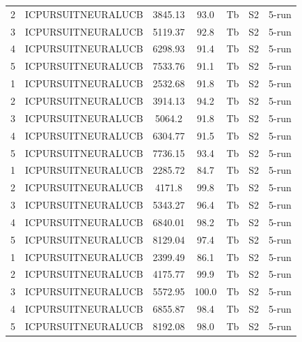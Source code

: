 \documentclass[11pt]{article}
\begin{document}
\begin{center}
\begin{longtable}{|c|c|c|c|c|c|c|}
2 & ICPURSUITNEURALUCB & 3845.13 & 93.0 & Tb & S2 & 5-run \\
3 & ICPURSUITNEURALUCB & 5119.37 & 92.8 & Tb & S2 & 5-run \\
4 & ICPURSUITNEURALUCB & 6298.93 & 91.4 & Tb & S2 & 5-run \\
5 & ICPURSUITNEURALUCB & 7533.76 & 91.1 & Tb & S2 & 5-run \\
1 & ICPURSUITNEURALUCB & 2532.68 & 91.8 & Tb & S2 & 5-run \\
2 & ICPURSUITNEURALUCB & 3914.13 & 94.2 & Tb & S2 & 5-run \\
3 & ICPURSUITNEURALUCB & 5064.2 & 91.8 & Tb & S2 & 5-run \\
4 & ICPURSUITNEURALUCB & 6304.77 & 91.5 & Tb & S2 & 5-run \\
5 & ICPURSUITNEURALUCB & 7736.15 & 93.4 & Tb & S2 & 5-run \\
1 & ICPURSUITNEURALUCB & 2285.72 & 84.7 & Tb & S2 & 5-run \\
2 & ICPURSUITNEURALUCB & 4171.8 & 99.8 & Tb & S2 & 5-run \\
3 & ICPURSUITNEURALUCB & 5343.27 & 96.4 & Tb & S2 & 5-run \\
4 & ICPURSUITNEURALUCB & 6840.01 & 98.2 & Tb & S2 & 5-run \\
5 & ICPURSUITNEURALUCB & 8129.04 & 97.4 & Tb & S2 & 5-run \\
1 & ICPURSUITNEURALUCB & 2399.49 & 86.1 & Tb & S2 & 5-run \\
2 & ICPURSUITNEURALUCB & 4175.77 & 99.9 & Tb & S2 & 5-run \\
3 & ICPURSUITNEURALUCB & 5572.95 & 100.0 & Tb & S2 & 5-run \\
4 & ICPURSUITNEURALUCB & 6855.87 & 98.4 & Tb & S2 & 5-run \\
5 & ICPURSUITNEURALUCB & 8192.08 & 98.0 & Tb & S2 & 5-run \\
\hline
\end{longtable}
\end{center}
\end{document}

